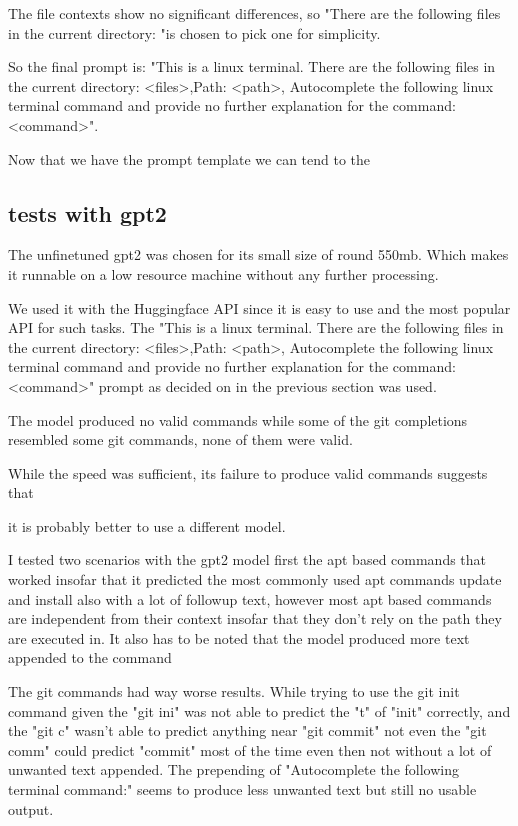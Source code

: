 The file contexts show no significant differences, so "There are the following files in the current  directory: "is chosen to pick one for simplicity.



So the final prompt is: "This is a linux terminal. There are the following files in the current  directory: <files>,Path: <path>, Autocomplete the following linux terminal command and provide no further explanation for the command: <command>".


Now that we have the prompt template we can tend to the 


\pagebreak
\subsection{tests with gpt2}\raggedbottom

The unfinetuned gpt2 was chosen for its small size of round 550mb. Which makes it runnable on a low resource machine without any further processing. 

We used it with the Huggingface API since it is easy to use and the most popular API for such tasks. The "This is a linux terminal. There are the following files in the current  directory: <files>,Path: <path>, Autocomplete the following linux terminal command and provide no further explanation for the command: <command>" prompt as decided on in the previous section was used.


The model produced no valid commands while some of the git  completions resembled some git commands, none of them were valid.

While the speed was sufficient, its failure to produce valid commands suggests that

it is probably better to use a different model. 





I tested two scenarios with the gpt2 model first the apt based commands that worked insofar that it predicted the most commonly used apt commands update and install also with a lot of followup text, however most apt based commands are independent from their context insofar that they don't rely on the path they are executed in. It also has to be noted that the model produced more text appended to the command 


The git commands had way worse results. While trying to use the git  init command given the "git ini" was not able to predict the "t" of "init" correctly, and the "git c" wasn't able to predict anything near "git commit" not even  the "git comm" could predict "commit" most of the time even then not without a lot of unwanted text appended. The prepending of "Autocomplete the following terminal command:" seems to produce less unwanted text but still no usable output. 

